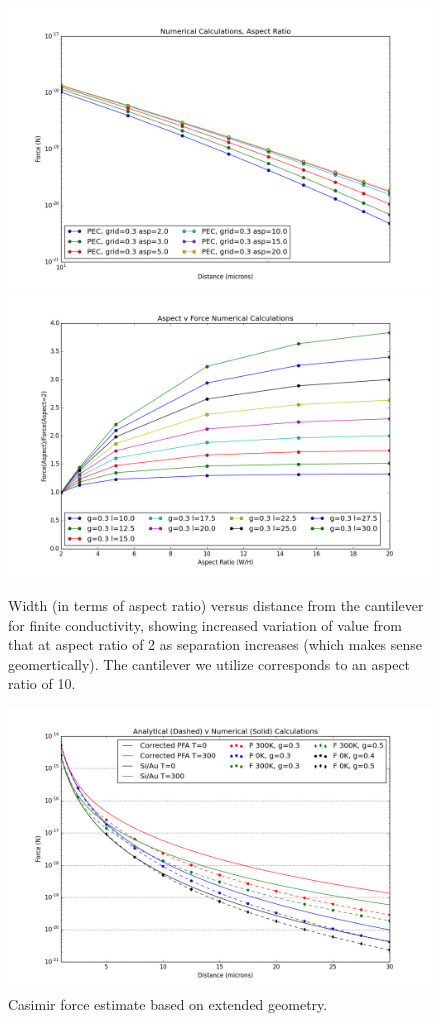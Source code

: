 \documentclass[11pt,traditabstract]{article}
\begin{document}
\begin{figure}[h]
\centering
\includegraphics[width=5in]{force_v_aspect_finite}
\includegraphics[width=5in]{aspect_correction_finite}
\caption{Width (in terms of aspect ratio) versus distance from the cantilever for finite conductivity, showing increased variation of value from that at aspect ratio of 2 as separation increases (which makes sense geomertically). The cantilever we utilize corresponds to an aspect ratio of 10.}\label{fig:aspectFinite}
\end{figure}

\begin{figure}[h]
\centering
\includegraphics[width=7in]{analytic_v_numerical_best}
\caption{Casimir force estimate based on extended geometry.}\label{fig:estimate}
\end{figure}
\end{document}
